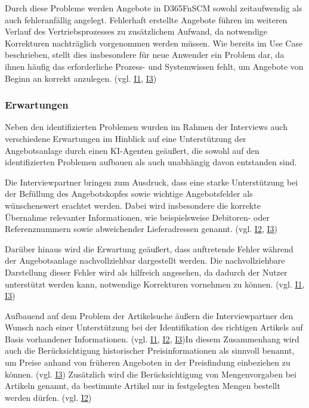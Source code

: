 Durch diese Probleme werden Angebote in \ac{D365FnSCM} sowohl zeitaufwendig als auch fehleranfällig angelegt. Fehlerhaft erstellte Angebote führen im weiteren Verlauf des Vertriebsprozesses zu zusätzlichem Aufwand, da notwendige Korrekturen nachträglich vorgenommen werden müssen. Wie bereits im Use Case beschrieben, stellt dies insbesondere für neue Anwender ein Problem dar, da ihnen häufig das erforderliche Prozess- und Systemwissen fehlt, um Angebote von Beginn an korrekt anzulegen. (vgl. \hyperref[anhang:i1]{I1}, \hyperref[anhang:i3]{I3})

\subsubsection{Erwartungen}
Neben den identifizierten Problemen wurden im Rahmen der Interviews auch verschiedene Erwartungen im Hinblick auf eine Unterstützung der Angebotsanlage durch einen \ac{KI}-Agenten geäußert, die sowohl auf den identifizierten Problemen aufbauen als auch unabhängig davon entstanden sind.

Die Interviewpartner bringen zum Ausdruck, dass eine starke Unterstützung bei der Befüllung des Angebotskopfes sowie wichtige Angebotsfelder als wünschenswert erachtet werden. Dabei wird insbesondere die korrekte Übernahme relevanter Informationen, wie beispielsweise Debitoren- oder Referenznummern sowie abweichender Lieferadressen genannt. (vgl. \hyperref[anhang:i2]{I2}, \hyperref[anhang:i3]{I3})

Darüber hinaus wird die Erwartung geäußert, dass auftretende Fehler während der Angebotsanlage nachvollziehbar dargestellt werden. Die nachvollziehbare Darstellung dieser Fehler wird als hilfreich angesehen, da dadurch der Nutzer unterstützt werden kann, notwendige Korrekturen vornehmen zu können. (vgl. \hyperref[anhang:i1]{I1}, \hyperref[anhang:i3]{I3})

Aufbauend auf dem Problem der Artikelsuche äußern die Interviewpartner den Wunsch nach einer Unterstützung bei der Identifikation des richtigen Artikels auf Basis vorhandener Informationen. (vgl. \hyperref[anhang:i1]{I1}, \hyperref[anhang:i2]{I2}, \hyperref[anhang:i3]{I3})In diesem Zusammenhang wird auch die Berücksichtigung historischer Preisinformationen als sinnvoll benannt, um Preise anhand von früheren Angeboten in der Preisfindung einbeziehen zu können. (vgl. \hyperref[anhang:i3]{I3}) Zusätzlich wird die Berücksichtigung von Mengenvorgaben bei Artikeln genannt, da bestimmte Artikel nur in festgelegten Mengen bestellt werden dürfen. (vgl. \hyperref[anhang:i2]{I2})

